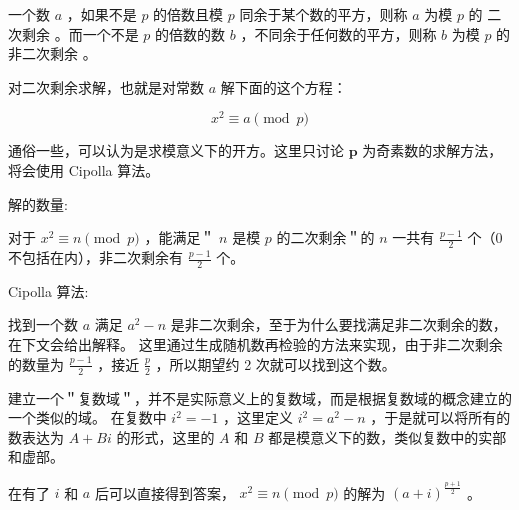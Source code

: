一个数 $a$ ，如果不是 $p$ 的倍数且模 $p$ 同余于某个数的平方，则称 $a$ 为模 $p$ 的 二次剩余 。而一个不是 $p$ 的倍数的数 $b$ ，不同余于任何数的平方，则称 $b$ 为模 $p$ 的非二次剩余 。

对二次剩余求解，也就是对常数 $a$ 解下面的这个方程：

$$
x^2 \equiv a \pmod p
$$

通俗一些，可以认为是求模意义下的开方。这里只讨论 $\boldsymbol{p}$  为奇素数的求解方法，将会使用 Cipolla 算法。

解的数量:

对于 $x^2 \equiv n \pmod p$ ，能满足＂ $n$ 是模 $p$ 的二次剩余＂的 $n$ 一共有 $\frac{p-1}{2}$ 个（0 不包括在内），非二次剩余有 $\frac{p-1}{2}$ 个。

Cipolla 算法:

找到一个数 $a$ 满足 $a^2-n$ 是非二次剩余，至于为什么要找满足非二次剩余的数，在下文会给出解释。
这里通过生成随机数再检验的方法来实现，由于非二次剩余的数量为 $\frac{p-1}{2}$ ，接近 $\frac{p}{2}$ ，所以期望约 2 次就可以找到这个数。

建立一个＂复数域＂，并不是实际意义上的复数域，而是根据复数域的概念建立的一个类似的域。
在复数中 $i^2=-1$ ，这里定义 $i^2=a^2-n$ ，于是就可以将所有的数表达为 $A+Bi$ 的形式，这里的 $A$ 和 $B$ 都是模意义下的数，类似复数中的实部和虚部。

在有了 $i$ 和 $a$ 后可以直接得到答案， $x^2\equiv n\pmod p$ 的解为 $(a+i)^{\frac{p+1}{2}}$ 。
